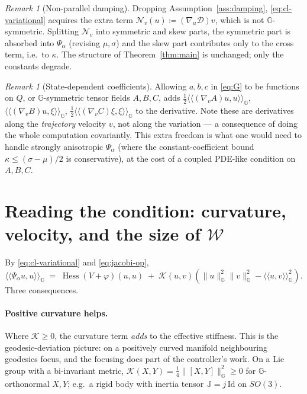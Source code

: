 \documentclass[11pt,a4paper]{article}
\newcommand{\Gm}{\mathbb{G}}                      %
\newcommand{\ipG}[2]{\langle\!\langle #1 , #2 \rangle\!\rangle_{\Gm}}
\newcommand{\Hess}{\operatorname{Hess}}
\newcommand{\Sect}{\mathcal{K}}
\newcommand{\Damp}{\mathcal{D}}
\newcommand{\Stiff}{\Psi}
\newcommand{\id}{\mathrm{Id}}
\newcommand{\normG}[1]{\lVert #1 \rVert_{\Gm}}
\theoremstyle{plain}
\theoremstyle{definition}
\theoremstyle{remark}
\newtheorem{remark}[theorem]{Remark}
\begin{document}
\begin{remark}[Non-parallel damping]
Dropping Assumption~\ref{ass:damping}, \eqref{eq:cl-variational} acquires the
extra term $\mathcal{N}_v(u) \coloneqq (\nabla_u\Damp)v$, which is not
$\Gm$-symmetric. Splitting $\mathcal{N}_v$ into symmetric and skew parts, the
symmetric part is absorbed into $\Stiff_\alpha$ (revising $\mu,\sigma$) and the
skew part contributes only to the cross term, i.e.\ to $\kappa$. The structure of
Theorem~\ref{thm:main} is unchanged; only the constants degrade.
\end{remark}

\begin{remark}[State-dependent coefficients]
Allowing $a,b,c$ in \eqref{eq:G} to be functions on $Q$, or $\Gm$-symmetric tensor
fields $A,B,C$, adds $\tfrac12\ipG{(\nabla_vA)u}{u}$,
$\ipG{(\nabla_vB)u}{\xi}$, $\tfrac12\ipG{(\nabla_vC)\xi}{\xi}$ to the derivative.
Note these are derivatives along the \emph{trajectory} velocity $v$, not along the
variation --- a consequence of doing the whole computation covariantly. This extra
freedom is what one would need to handle strongly anisotropic $\Stiff_\alpha$
(where the constant-coefficient bound $\kappa \le (\sigma-\mu)/2$ is
conservative), at the cost of a coupled PDE-like condition on $A,B,C$.
\end{remark}

\section{Reading the condition: curvature, velocity, and the size of \texorpdfstring{$\mathcal{W}$}{W}}
\label{sec:reading}

By \eqref{eq:cl-variational} and \eqref{eq:jacobi-op},
\begin{equation}
  \ipG{\Stiff_\alpha u}{u}
  \;=\; \Hess(V+\varphi)(u,u)
  \;+\; \Sect(u,v)\left(\normG{u}^2\normG{v}^2 - \ipG{u}{v}^2\right).
  \label{eq:stiffness-decomp}
\end{equation}
Three consequences.

\paragraph{Positive curvature helps.} Where $\Sect \ge 0$, the curvature term
\emph{adds} to the effective stiffness. This is the geodesic-deviation picture:
on a positively curved manifold neighbouring geodesics focus, and the focusing
does part of the controller's work. On a Lie group with a bi-invariant metric,
$\Sect(X,Y) = \tfrac14\normG{[X,Y]}^2 \ge 0$ for $\Gm$-orthonormal $X,Y$; e.g.\
a rigid body with inertia tensor $\mathbb{J} = j\,\id$ on $SO(3)$.
\end{document}
